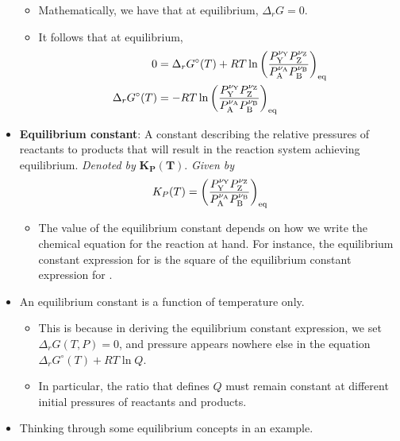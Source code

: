 \documentclass[../notes.tex]{subfiles}
\begin{document}
\begin{itemize}
    \begin{itemize}
        \item Mathematically, we have that at equilibrium, $\Delta_rG=0$.
        \item It follows that at equilibrium,
        \begin{align*}
            0 &= \Delta_rG^\circ(T)+RT\ln\left( \frac{P_{\ce{Y}}^{\nu_{\ce{Y}}}P_{\ce{Z}}^{\nu_{\ce{Z}}}}{P_{\ce{A}}^{\nu_{\ce{A}}}P_{\ce{B}}^{\nu_{\ce{B}}}} \right)_\text{eq}\\
            \Delta_rG^\circ(T) &= -RT\ln\left( \frac{P_{\ce{Y}}^{\nu_{\ce{Y}}}P_{\ce{Z}}^{\nu_{\ce{Z}}}}{P_{\ce{A}}^{\nu_{\ce{A}}}P_{\ce{B}}^{\nu_{\ce{B}}}} \right)_\text{eq}
        \end{align*}
    \end{itemize}
    \item \textbf{Equilibrium constant}: A constant describing the relative pressures of reactants to products that will result in the reaction system achieving equilibrium. \emph{Denoted by} $\bm{K_P(T)}$. \emph{Given by}
    \begin{equation*}
        K_P(T) = \left( \frac{P_{\ce{Y}}^{\nu_{\ce{Y}}}P_{\ce{Z}}^{\nu_{\ce{Z}}}}{P_{\ce{A}}^{\nu_{\ce{A}}}P_{\ce{B}}^{\nu_{\ce{B}}}} \right)_\text{eq}
    \end{equation*}
    \begin{itemize}
        \item The value of the equilibrium constant depends on how we write the chemical equation for the reaction at hand. For instance, the equilibrium constant expression for  is the square of the equilibrium constant expression for .
    \end{itemize}
    \item An equilibrium constant is a function of temperature only.
    \begin{itemize}
        \item This is because in deriving the equilibrium constant expression, we set $\Delta_rG(T,P)=0$, and pressure appears nowhere else in the equation $\Delta_rG^\circ(T)+RT\ln Q$.
        \item In particular, the ratio that defines $Q$ must remain constant at different initial pressures of reactants and products.
    \end{itemize}
    \item Thinking through some equilibrium concepts in an example.
    \begin{itemize}

\end{itemize}
\end{itemize}
\end{document}
